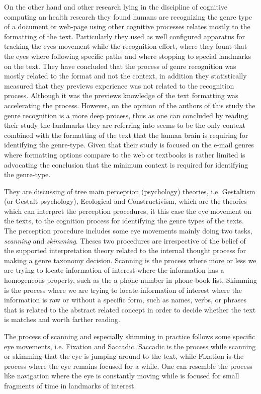 On the other hand and other research lying in the discipline of cognitive computing an health research they found humans are recognizing the genre type of a document or web-page using other cognitive processes relates mostly to the formatting of the text. Particularly they used as well configured apparatus for tracking the eyes movement while the recognition effort, where they fount that the eyes where following specific paths and where stopping to special landmarks on the text. They have concluded that the process of genre recognition was mostly related to the format and not the context, in addition they statistically measured that they previews experience was not related to the recognition process. Although it was the previews knowledge of the text formatting was accelerating the process. However, on the opinion of the authors of this study the genre recognition is a more deep process, thus as one can concluded by reading their study the landmarks they are referring into seems to be the only context combined with the formatting of the text that the human brain is requiring for identifying the genre-type. Given that their study is focused on the e-mail genres where formatting options compare to the web or textbooks is rather limited is advocating the conclusion that the minimum context is required for identifying the genre-type.

They are discussing of tree main perception (psychology) theories, i.e. Gestaltism (or Gestalt psychology), Ecological and Constructivism, which are the theories which can interpret the perception procedures, it this case the eye movement on the texts, to the cognition process for identifying the genre types of the texts. The perception procedure includes some eye movements mainly doing two tasks, \textit{scanning} and \textit{skimming}. Theses two procedures are irrespective of the belief of the supported interpretation theory related to the internal thought process for making a genre taxonomy decision. Scanning is the process where more or less we are trying to locate information of interest where the information has a homogeneous property, such as the a phone number in phone-book list. Skimming is the process where we are trying to locate information of interest where the information is raw or without a specific form, such as names, verbs, or phrases that is related to the abstract related concept in order to decide whether the text is matches and worth farther reading. 

The process of scanning and especially skimming in practice follows some specific eye movements, i.e. Fixation and Saccadic. Saccadic is the process while scanning or skimming that the eye is jumping around to the text, while Fixation is the process where the eye remains focused for a while. One can resemble the process like navigation where the eye is constantly moving while is focused for small fragments of time in landmarks of interest.
  
